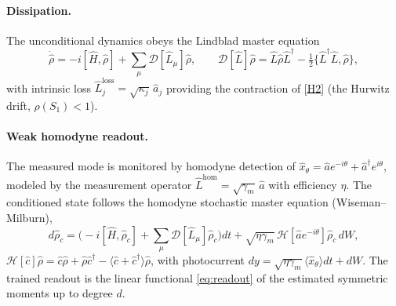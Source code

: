 \documentclass[11pt]{article}
\theoremstyle{remark}
\newcommand{\ahat}{\hat{a}}
\begin{document}
\paragraph{Dissipation.}
The unconditional dynamics obeys the Lindblad master equation
\[
\dot{\hat\rho}=-i[\hat H,\hat\rho]+\sum_\mu\mathcal D[\hat L_\mu]\hat\rho,
\qquad \mathcal D[\hat L]\hat\rho=\hat L\hat\rho\hat L^\dagger
-\tfrac12\{\hat L^\dagger\hat L,\hat\rho\},
\]
with intrinsic loss $\hat L_j^{\mathrm{loss}}=\sqrt{\kappa_j}\,\ahat_j$ providing
the contraction of \ref{H2} (the Hurwitz drift, $\rho(S_1)<1$).

\paragraph{Weak homodyne readout.}
The measured mode is monitored by homodyne detection of
$\hat x_\theta=\ahat e^{-i\theta}+\ahat^\dagger e^{i\theta}$, modeled by the
measurement operator $\hat L^{\mathrm{hom}}=\sqrt{\gamma_m}\,\ahat$ with
efficiency $\eta$. The conditioned state follows the homodyne stochastic master
equation (Wiseman--Milburn),
\[
d\hat\rho_c=\Big(-i[\hat H,\hat\rho_c]+\textstyle\sum_\mu
\mathcal D[\hat L_\mu]\hat\rho_c\Big)dt
+\sqrt{\eta\gamma_m}\,\mathcal H[\ahat e^{-i\theta}]\hat\rho_c\,dW,
\]
$\mathcal H[\hat c]\hat\rho=\hat c\hat\rho+\hat\rho\hat c^\dagger
-\langle\hat c+\hat c^\dagger\rangle\hat\rho$, with photocurrent
$dy=\sqrt{\eta\gamma_m}\langle\hat x_\theta\rangle dt+dW$. The trained readout is
the linear functional \eqref{eq:readout} of the estimated symmetric moments up to
degree $d$.
\end{document}
